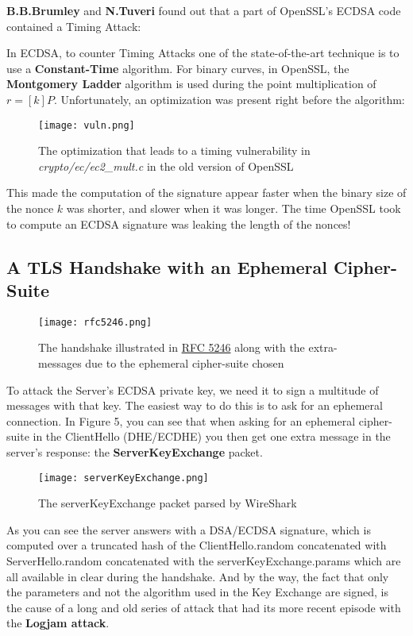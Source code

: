 \documentclass[a4paper,11pt]{article}
\begin{document}
\textbf{B.B.Brumley} and \textbf{N.Tuveri} found out\cite{brumley-tuveri} that a part of OpenSSL's ECDSA code contained a Timing Attack:

In ECDSA, to counter Timing Attacks one of the state-of-the-art technique is to use a \textbf{Constant-Time} algorithm. For binary curves, in OpenSSL, the \textbf{Montgomery Ladder} algorithm is used during the point multiplication of $r = [k] P$. Unfortunately, an optimization was present right before the algorithm:

\begin{figure}[H]
\texttt{[image: vuln.png]}
\caption{The optimization that leads to a timing vulnerability in \textit{crypto/ec/ec2\_mult.c} in the old version of OpenSSL}
\end{figure}

This made the computation of the signature appear faster when the binary size of the nonce $k$ was shorter, and slower when it was longer. The time OpenSSL took to compute an ECDSA signature was leaking the length of the nonces!

\subsection{A TLS Handshake with an Ephemeral Cipher-Suite}

\begin{figure}[H]
\texttt{[image: rfc5246.png]}
\caption{The handshake illustrated in \href{https://tools.ietf.org/html/rfc5246#section-7.3}{RFC 5246} along with the extra-messages due to the ephemeral cipher-suite chosen}
\end{figure}

To attack the Server's ECDSA private key, we need it to sign a multitude of messages with that key. The easiest way to do this is to ask for an ephemeral connection. In Figure 5, you can see that when asking for an ephemeral cipher-suite in the ClientHello (DHE/ECDHE) you then get one extra message in the server's response: the \textbf{ServerKeyExchange} packet.

\begin{figure}[H]
\texttt{[image: serverKeyExchange.png]}
\caption{The serverKeyExchange packet parsed by WireShark}
\end{figure}

As you can see the server answers with a DSA/ECDSA signature, which is computed over a truncated hash of the ClientHello.random concatenated with ServerHello.random concatenated with the serverKeyExchange.params which are all available in clear during the handshake. And by the way, the fact that only the parameters and not the algorithm used in the Key Exchange are signed, is the cause of a long and old series of attack that had its more recent episode with the \textbf{Logjam attack}\cite{logjam}.
\end{document}
